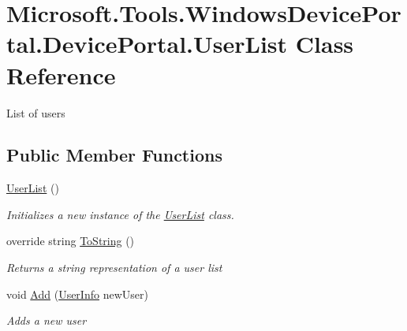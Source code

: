 \hypertarget{class_microsoft_1_1_tools_1_1_windows_device_portal_1_1_device_portal_1_1_user_list}{}\section{Microsoft.\+Tools.\+Windows\+Device\+Portal.\+Device\+Portal.\+User\+List Class Reference}
\label{class_microsoft_1_1_tools_1_1_windows_device_portal_1_1_device_portal_1_1_user_list}


List of users  


\subsection*{Public Member Functions}
\begin{DoxyCompactItemize}
\item 
\hyperlink{class_microsoft_1_1_tools_1_1_windows_device_portal_1_1_device_portal_1_1_user_list_a3e89e5fdaaa2a1d5c357eec118ac0cd4}{User\+List} ()
\begin{DoxyCompactList}\small\item\em Initializes a new instance of the \hyperlink{class_microsoft_1_1_tools_1_1_windows_device_portal_1_1_device_portal_1_1_user_list}{User\+List} class. \end{DoxyCompactList}\item 
override string \hyperlink{class_microsoft_1_1_tools_1_1_windows_device_portal_1_1_device_portal_1_1_user_list_a7c0ec88805d4dfe6c790e981aec2adde}{To\+String} ()
\begin{DoxyCompactList}\small\item\em Returns a string representation of a user list \end{DoxyCompactList}\item 
void \hyperlink{class_microsoft_1_1_tools_1_1_windows_device_portal_1_1_device_portal_1_1_user_list_a951ce013f7ea7bc3aa69193232e6b838}{Add} (\hyperlink{class_microsoft_1_1_tools_1_1_windows_device_portal_1_1_device_portal_1_1_user_info}{User\+Info} new\+User)
\begin{DoxyCompactList}\small\item\em Adds a new user \end{DoxyCompactList}\end{DoxyCompactItemize}
